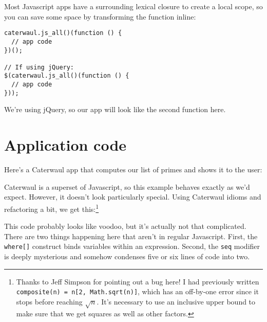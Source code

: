 \documentclass{report}
\begin{document}
    Most Javascript apps have a surrounding lexical closure to create a local scope, so you can save some space by transforming the function inline:

\begin{verbatim}
caterwaul.js_all()(function () {
  // app code
})();

// If using jQuery:
$(caterwaul.js_all()(function () {
  // app code
}));
\end{verbatim}

    We're using jQuery, so our app will look like the second function here.

\section{Application code}
    Here's a Caterwaul app that computes our list of primes and shows it to the user:


    Caterwaul is a superset of Javascript, so this example behaves exactly as we'd expect. However, it doesn't look particularly special. Using Caterwaul idioms and refactoring a bit, we get
    this:\footnote{Thanks to Jeff Simpson for pointing out a bug here! I had previously written {\tt composite(n) = n[2, Math.sqrt(n)]}, which has an off-by-one error since it stops before
    reaching $\sqrt n$. It's necessary to use an inclusive upper bound to make sure that we get squares as well as other factors.}


    This code probably looks like voodoo, but it's actually not that complicated. There are two things happening here that aren't in regular Javascript. First, the {\tt where[]} construct
    binds variables within an expression. Second, the {\tt seq} modifier is deeply mysterious and somehow condenses five or six lines of code into two.
\end{document}
